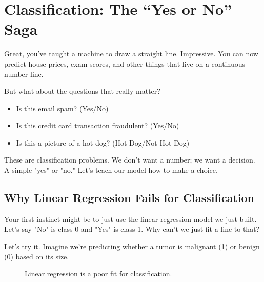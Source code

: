 \documentclass[11pt, letterpaper, openany]{book}
\begin{document}
\chapter{Classification: The “Yes or No” Saga}
\label{chap:classification}

Great, you've taught a machine to draw a straight line. Impressive. You can now predict house prices, exam scores, and other things that live on a continuous number line.

But what about the questions that really matter?
\begin{itemize}
    \item Is this email spam? (Yes/No)
    \item Is this credit card transaction fraudulent? (Yes/No)
    \item Is this a picture of a hot dog? (Hot Dog/Not Hot Dog)
\end{itemize}
These are classification problems. We don't want a number; we want a decision. A simple "yes" or "no." Let's teach our model how to make a choice.

\section{Why Linear Regression Fails for Classification}

Your first instinct might be to just use the linear regression model we just built. Let's say "No" is class 0 and "Yes" is class 1. Why can't we just fit a line to that?

Let's try it. Imagine we're predicting whether a tumor is malignant (1) or benign (0) based on its size.

\begin{figure}[h!]
\centering
{}
\caption{Linear regression is a poor fit for classification.}
\end{figure}
\end{document}
